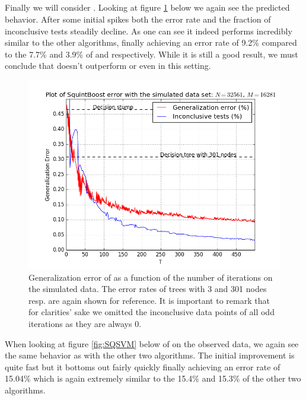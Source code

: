 \subsection{\squintB}
\label{subsec:sqPracPerf}
Finally we will consider \squintB. Looking at figure \ref{fig:SQGD} below we again see the predicted behavior. After some initial spikes both the error rate and the fraction of inconclusive tests steadily decline. As one can see it indeed performs incredibly similar to the other algorithms, finally achieving an error rate of 9.2\% compared to the 7.7\% and 3.9\% of \adaB and \NHB respectively. While it is still a good result, we must conclude that \squintB doesn't outperform \NHB or even \adaB in this setting. 
\begin{figure}[!ht]
  \centering
     \includegraphics[width=\graphWidth]{generated/SQGD.png}
  \caption{Generalization error of \squintB as a function of the number of iterations on the simulated data. The error rates of trees with 3 and 301 nodes resp. are again shown for reference. It is important to remark that for clarities' sake we omitted the inconclusive data points of all odd iterations as they are always 0.}
      \label{fig:SQGD}
\end{figure}

\par When looking at figure \ref{fig:SQSVM} below of \squintB on the observed data, we again see the same behavior as with the other two algorithms. The initial improvement is quite fast but it bottoms out fairly quickly finally achieving an error rate of 15.04\% which is again extremely similar to the 15.4\% and 15.3\% of the other two algorithms. 


